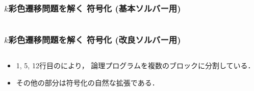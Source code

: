 \begin{frame}[shrink]
  \frametitle{$k$彩色遷移問題を解く 符号化 {\small(基本ソルバー用)}}

\begin{columns}[t]
\begin{column}{0.9\linewidth}
\begin{exampleblock}{}
 
\end{exampleblock}    
\end{column}
\end{columns}

\end{frame}
\begin{frame}[shrink]
  \frametitle{$k$彩色遷移問題を解く 符号化 {\small(改良ソルバー用)}}

\begin{columns}[t]
\begin{column}{0.9\linewidth}
\begin{exampleblock}{}
 
\end{exampleblock}    
\end{column}
\end{columns}

\begin{itemize}
  \item 1, 5, 12行目のにより，
    論理プログラムを複数のブロックに分割している．
  \item その他の部分は符号化の自然な拡張である．
\end{itemize}
\end{frame}
